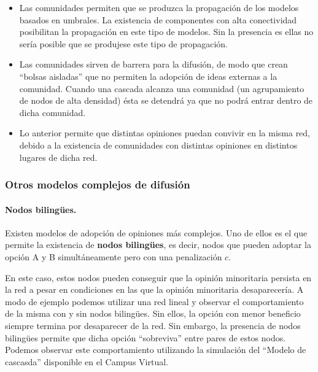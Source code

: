\documentclass[]{article}
\begin{document}
\begin{itemize}
\itemsep1pt\parskip0pt
\item
  Las comunidades permiten que se produzca la propagación de los modelos
  basados en umbrales. La existencia de componentes con alta
  conectividad posibilitan la propagación en este tipo de modelos. Sin
  la presencia es ellas no sería posible que se produjese este tipo de
  propagación.
\item
  Las comunidades sirven de barrera para la difusión, de modo que crean
  ``bolsas aisladas'' que no permiten la adopción de ideas externas a la
  comunidad. Cuando una cascada alcanza una comunidad (un agrupamiento
  de nodos de alta densidad) ésta se detendrá ya que no podrá entrar
  dentro de dicha comunidad.
\item
  Lo anterior permite que distintas opiniones puedan convivir en la
  misma red, debido a la existencia de comunidades con distintas
  opiniones en distintos lugares de dicha red.
\end{itemize}

\subsubsection{Otros modelos complejos de
difusión}\label{otros-modelos-complejos-de-difusiuxf3n}

\paragraph*{Nodos bilingües.}\label{nodos-bilinguxfces.}

Existen modelos de adopción de opiniones más complejos. Uno de ellos es
el que permite la existencia de \textbf{nodos bilingües}, es decir,
nodos que pueden adoptar la opción A y B simultáneamente pero con una
penalización \(c\).

En este caso, estos nodos pueden conseguir que la opinión minoritaria
persista en la red a pesar en condiciones en las que la opinión
minoritaria desaparecería. A modo de ejemplo podemos utilizar una red
lineal y observar el comportamiento de la misma con y sin nodos
bilingües. Sin ellos, la opción con menor beneficio siempre termina por
desaparecer de la red. Sin embargo, la presencia de nodos bilingües
permite que dicha opción ``sobreviva'' entre pares de estos nodos.
Podemos observar este comportamiento utilizando la simulación del
``Modelo de cascasda'' disponible en el Campus Virtual.
\end{document}
